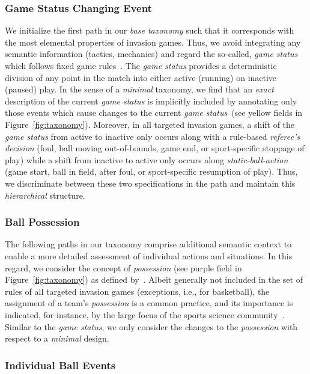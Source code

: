 \subsubsection{Game Status Changing Event}
We initialize the first path in our \textit{base taxonomy} such that it corresponds with the most elemental properties of invasion games. Thus, we avoid integrating any semantic information (tactics, mechanics) and regard the so-called, \textit{game status} which follows fixed game rules~\cite{IFAB, IHF}.
The \textit{game status} provides a deterministic division of any point in the match into either active (running) on inactive (paused) play. %
In the sense of a \textit{minimal} taxonomy, we find that an \textit{exact} description of the current \textit{game status} is implicitly included by annotating only those events which cause changes to the current \textit{game status}~(see yellow fields in Figure~\ref{fig:taxonomy}).
Moreover, in all targeted invasion games, a shift of the \textit{game status} from active to inactive only occurs along with a rule-based \textit{referee's decision} (foul, ball moving out-of-bounds, game end, or sport-specific stoppage of play) while a shift from inactive to active only occurs along \textit{static-ball-action} (game start, ball in field, after foul, or sport-specific resumption of play). Thus, we discriminate between these two specifications in the path and maintain this \textit{hierarchical} structure.

\subsubsection{Ball Possession}
The following paths in our taxonomy comprise additional semantic context to enable a more detailed assessment of individual actions and situations. In this regard, we consider the concept of \textit{possession} (see purple field in Figure~\ref{fig:taxonomy}) as defined by~\citet{link2017individual}. Albeit generally not included in the set of rules of all targeted invasion games (exceptions, i.e., for basketball), the assignment of a team's \textit{possession} is a common practice, and its importance is indicated, for instance, by the large focus of the sports science community~\cite{camerino2012dynamics, casal2017possession, jones2004possession, lago2010game}. 
Similar to the \textit{game status}, we only consider the changes to the \textit{possession} with respect to a \textit{minimal} design. 

\subsubsection{Individual Ball Events}

